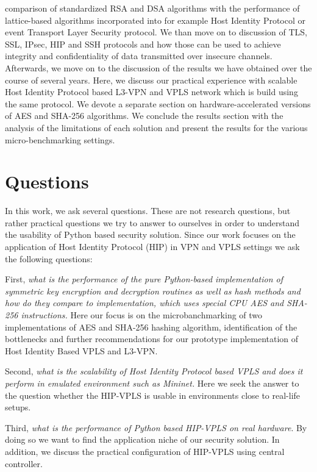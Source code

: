 comparison of standardized RSA and DSA algorithms with the performance of 
lattice-based algorithms incorporated into for example Host Identity Protocol 
or event Transport Layer Security protocol. We than move on to discussion of 
TLS, SSL, IPsec, HIP and SSH protocols and how those can be used to achieve 
integrity and confidentiality of data transmitted over insecure channels. 
Afterwards, we move on to the discussion of the results we have obtained 
over the course of several years. Here, we discuss our practical experience 
with scalable Host Identity Protocol based L3-VPN and VPLS network which is 
build using the same protocol. We devote a separate section on 
hardware-accelerated versions of AES and SHA-256 algorithms. We conclude 
the results section with the analysis of the limitations of each solution 
and present the results for the various micro-benchmarking settings. 


\section{Questions}

In this work, we ask several questions. These are not research questions, 
but rather practical questions we try to answer to ourselves in order to 
understand the usability of Python based security solution. Since our work 
focuses on the application of Host Identity Protocol (HIP) in VPN and VPLS 
settings we ask the following questions:

First, {\it what is the performance of the pure Python-based implementation of 
symmetric key encryption and decryption routines as well as hash methods and 
how do they compare to implementation, which uses special CPU AES and SHA-256 
instructions.} Here our focus is on the microbanchmarking of two implementations 
of AES and SHA-256 hashing algorithm, identification of the bottlenecks and 
further recommendations for our prototype implementation of Host Identity Based VPLS and L3-VPN.

Second, {\it what is the scalability of Host Identity Protocol based VPLS and does 
it perform in emulated environment such as Mininet.} Here we seek the answer to 
the question whether the HIP-VPLS is usable in environments close to real-life setups.

Third, {\it what is the performance of Python based HIP-VPLS on real hardware}. By 
doing so we want to find the application niche of our security solution. In addition, 
we discuss the practical configuration of HIP-VPLS using central controller.

